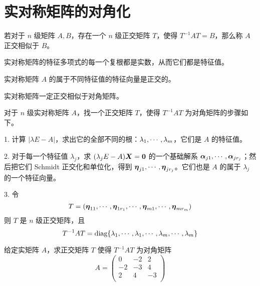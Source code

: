 \section{实对称矩阵的对角化}

若对于 $n$ 级矩阵 $A,B$，存在一个 $n$ 级正交矩阵 $T$，使得 $T^{-1}AT=B$，那么称 $A$ 正交相似于 $B$。

\begin{theorem}
	实对称矩阵的特征多项式的每一个复根都是实数，从而它们都是特征值。
\end{theorem}

\begin{theorem}
	实对称矩阵 $A$ 的属于不同特征值的特征向量是正交的。
\end{theorem}

\begin{theorem}
	实对称矩阵一定正交相似于对角矩阵。
\end{theorem}

对于 $n$ 级实对称矩阵 $A$，找一个正交矩阵 $T$，使得 $T^{-1}AT$ 为对角矩阵的步骤如下。

1. 计算 $|\lambda E- A|$，求出它的全部不同的根：$\lambda_1,\cdots,\lambda_m$，它们是 $A$ 的特征值。

2. 对于每一个特征值 $\lambda_j$，求 $(\lambda_jE-A)\boldsymbol{X} = \boldsymbol{0}$ 的一个基础解系 $\boldsymbol{\alpha}_{j1},\cdots,\boldsymbol{\alpha}_{jr_j}$；然后把它们 Schmidt 正交化和单位化，得到 $\boldsymbol{\eta}_{j1},\cdots,\boldsymbol{\eta}_{jr_j}$。它们也是 $A$ 的属于 $\lambda_j$ 的一个特征向量。

3. 令
\[ T=(\boldsymbol{\eta}_{11},\cdots,\boldsymbol{\eta}_{1r_1},\cdots,\boldsymbol{\eta}_{m1},\cdots,\boldsymbol{\eta}_{mr_m}) \]
则 $T$ 是 $n$ 级正交矩阵，且
\[ T^{-1}AT = \operatorname{diag}\{\lambda_{1},\cdots,\lambda_{1},\cdots,\lambda_{m},\cdots,\lambda_{m}\} \]

\begin{example}
	给定实矩阵 $A$，求正交矩阵 $T$ 使得 $T^{-1}AT$ 为对角矩阵
	\[ A=\left(
		\begin{matrix}
				0  & -2 & 2  \\
				-2 & -3 & 4  \\
				2  & 4  & -3 \\
			\end{matrix}
		\right) \]
\end{example}

